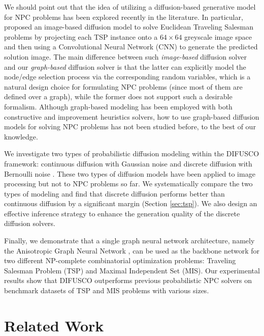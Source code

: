 \documentclass{article}
\theoremstyle{plain}
\theoremstyle{definition}
\theoremstyle{remark}
\newcommand{\method}{DIFUSCO}
\begin{document}
We should point out that the idea of utilizing a diffusion-based generative model for NPC problems has been explored recently in the literature. In particular, \citet{graikos2022diffusion} proposed an image-based diffusion model to solve Euclidean Traveling Salesman problems by projecting each TSP instance onto a $64\times64$ greyscale image space and then using a Convolutional Neural Network (CNN) to generate the predicted solution image. The main difference between such \textit{image-based} diffusion solver and our \textit{graph-based} diffusion solver is that the latter can explicitly model the node/edge selection process via the corresponding random variables, which is a natural design choice for formulating NPC problems (since most of them are defined over a graph), while the former does not support such a desirable formalism.  Although graph-based modeling has been employed with both constructive \citep{19iclr-am} and improvement heuristics \citep{d2020learning} solvers, how to use graph-based diffusion models for solving NPC problems has not been studied before, to the best of our knowledge.




We investigate two types of probabilistic diffusion modeling within the \method{} framework: continuous diffusion with Gaussian noise \citep{chen2022analog} and discrete diffusion with Bernoulli noise \citep{austin2021structured,hoogeboom2021argmax}. These two types of diffusion models have been applied to image processing but not to NPC problems so far. We systematically compare the two types of modeling and find that discrete diffusion performs better than continuous diffusion by a significant margin (Section \ref{sec:tsp}). We also design an effective inference strategy to enhance the generation quality of the discrete diffusion solvers.


Finally, we demonstrate that a single graph neural network architecture, namely the Anisotropic Graph Neural Network \citep{bresson2018experimental,joshi2022learning}, can be used as the backbone network for two different NP-complete combinatorial optimization problems: Traveling Salesman Problem (TSP) and Maximal Independent Set (MIS). Our experimental results show that \method{} outperforms previous probabilistic NPC solvers on benchmark datasets of TSP and MIS problems with various sizes.





\section{Related Work}
\end{document}
